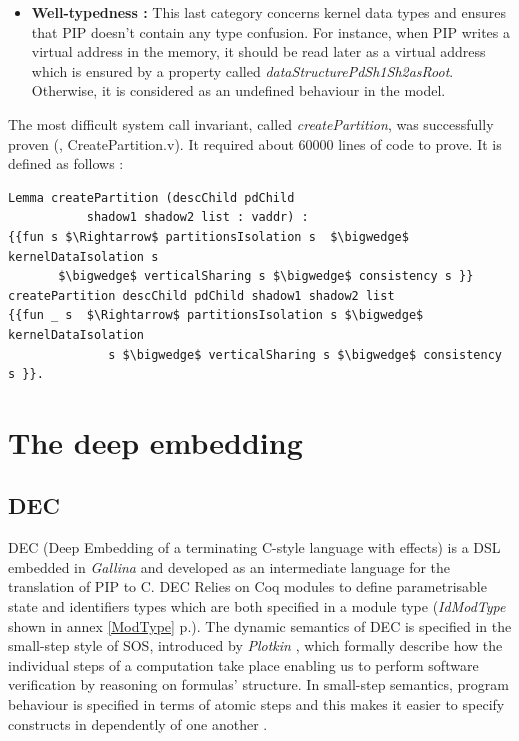 \begin{itemize}
\begin{lstlisting}[caption = {Example of a pages-consistency property}, mathescape=true,xleftmargin=.07\textwidth,
xrightmargin=.07\textwidth]
Definition noDupMappedPagesList s :=
$\forall$ partition, partition $\in$ getPartitions s $\rightarrow$
NoDup (getMappedPages partition s).
\end{lstlisting}	
	\item \textbf{Well-typedness :} This last category concerns kernel data types and ensures that PIP doesn't contain any type confusion. For instance, when PIP writes a virtual address in the memory, it should be read later as a virtual address which is ensured by a property called \textit{dataStructurePdSh1Sh2asRoot}. Otherwise, it is considered as an undefined behaviour in the model.
\end{itemize}
The most difficult system call invariant, called \textit{createPartition}, was successfully proven (\cite{PIP}, CreatePartition.v). It required about 60000 lines of code to prove. It is defined as follows :
\begin{lstlisting}[caption = {createPartition Hoare triple}, mathescape=true]
Lemma createPartition (descChild pdChild
           shadow1 shadow2 list : vaddr) :
{{fun s $\Rightarrow$ partitionsIsolation s  $\bigwedge$ kernelDataIsolation s 
	   $\bigwedge$ verticalSharing s $\bigwedge$ consistency s }} 
createPartition descChild pdChild shadow1 shadow2 list  
{{fun _ s  $\Rightarrow$ partitionsIsolation s $\bigwedge$ kernelDataIsolation 
              s $\bigwedge$ verticalSharing s $\bigwedge$ consistency s }}.
\end{lstlisting}	

\pagebreak

\section{The deep embedding} \label{deep}

\subsection{DEC}
DEC \cite{DEC} (Deep Embedding of a
terminating C-style language with effects) is a \gls{DSL} embedded in \textit{Gallina} and developed as an intermediate language for the translation of PIP to C. DEC Relies on Coq modules to define parametrisable state and identifiers types which are both specified in a module type (\textit{IdModType} shown in annex \ref{ModType} p.\pageref{ModType}). The dynamic semantics of DEC is specified in the small-step style of \gls{SOS}, introduced by \textit{Plotkin} \cite{SOS}, which formally describe how the individual steps of a computation take place enabling us to perform software verification by reasoning on formulas' structure. In small-step semantics, program behaviour is specified in terms of atomic steps and this makes it easier to specify constructs in dependently of one another \cite{TAOSD}. \\

